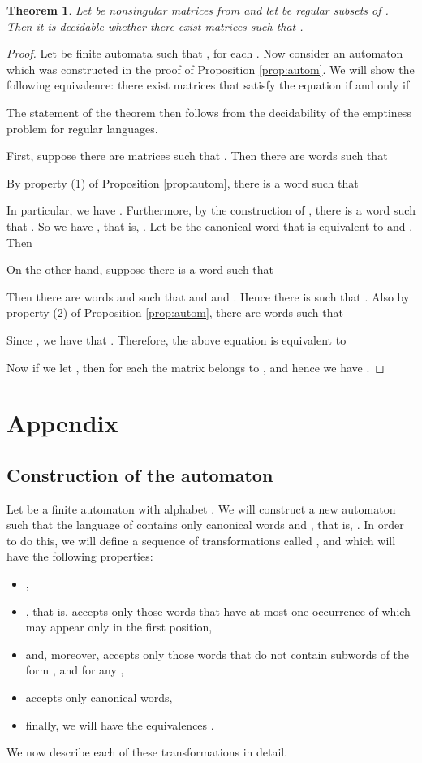 \documentclass[fontsize=11pt,DIV=13,paper=letter]{scrartcl}
\newtheorem{theorem}{Theorem}\newtheorem{proposition}[theorem]{Proposition}
\theoremstyle{definition}
\begin{document}
\begin{theorem}\label{thm:diag}
Let  be nonsingular matrices from  and let  be regular subsets of . Then it is decidable whether there exist matrices  such that .
\end{theorem}

\begin{proof}
Let  be finite automata such that , for each . Now consider an automaton  which was constructed in the proof of Proposition \ref{prop:autom}. We will show the following equivalence: there exist matrices  that satisfy the equation  if and only if

The statement of the theorem then follows from the decidability of the emptiness problem for regular languages. 

First, suppose there are matrices  such that . Then there are words  such that

By property (1) of Proposition \ref{prop:autom}, there is a word  such that

In particular, we have . Furthermore, by the construction of , there is a word  such that . So we have , that is, . Let  be the canonical word that is equivalent to  and . Then


On the other hand, suppose there is a word  such that

Then there are words  and  such that  and  and . Hence there is  such that . Also by property (2) of Proposition \ref{prop:autom}, there are words  such that

Since , we have that . Therefore, the above equation is equivalent to

Now if we let , then for each  the matrix  belongs to , and hence we have .

\end{proof}

\section{Appendix}

\subsection{Construction of the automaton }\label{Can}
Let  be a finite automaton with alphabet . We will construct a new automaton  such that the language of  contains only canonical words and , that is, . In order to do this, we will define a sequence of transformations called ,  and  which will have the following properties:
\begin{itemize}
\item ,
\item , that is,  accepts only those words that have at most one occurrence of  which may appear only in the first position,
\item  and, moreover,  accepts only those words that do not contain subwords of the form ,  and  for any ,
\item  accepts only canonical words,
\item finally, we will have the equivalences .
\end{itemize}
We now describe each of these transformations in detail.
\end{document}
